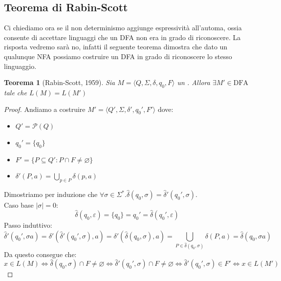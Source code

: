 \documentclass[a4paper,titlepage]{article}
\newtheorem{theorem}{Teorema}[section]
\theoremstyle{definition}
\newcommand{\DFA}{\langle Q,\Sigma,\delta,q_0,F\rangle}
\begin{document}
\subsection{Teorema di Rabin-Scott}
Ci chiediamo ora se il non determinismo aggiunge espressività all'automa, ossia consente di accettare linguaggi che un DFA non era in grado di riconoscere. La risposta vedremo sarà no, infatti il seguente teorema dimostra che dato un qualunque NFA possiamo costruire un DFA in grado di riconoscere lo stesso linguaggio. 
\begin{theorem}[Rabin-Scott, 1959]
	Sia $M = \DFA$ un . Allora $\exists M'\in\text{DFA}$ tale che $L(M) =  L(M')$
\end{theorem}
\begin{proof}
	Andiamo a costruire $M' = \langle Q', \Sigma, \delta', q_0', F' \rangle$ dove:
	\begin{itemize}
		\item $Q' = \mathcal P(Q)$
		\item $q_0' = \{q_0\}$
		\item $F'= \{P \subseteq Q': P\cap F \neq \varnothing\}$
		\item $\delta '(P, a) = \bigcup_{p \in P} \delta(p, a)$
	\end{itemize} 
	
	Dimostriamo per induzione che $\forall \sigma \in \Sigma^{*}.\hat{\delta}(q_0, \sigma) = \hat{\delta}'(q_0', \sigma)$. \\ Caso base $|\sigma| = 0$:
	\[
		\hat{\delta}(q_0, \varepsilon) = \{q_0\} = q_0' = \hat{\delta}(q_0', \varepsilon)
	\]
	Passo induttivo: 
	\[
		\hat\delta'(q_0', \sigma a) = 
		\delta'(\hat\delta'(q_0', \sigma), a) = 
		\delta'(\hat\delta(q_0, \sigma), a) = 
		\bigcup_{P \in \hat\delta(q_0, \sigma)} \delta(P, a) = \hat{\delta}(q_0, \sigma a)
	\]
	Da questo consegue che:
	\[
		x \in L(M) \iff \hat\delta(q_0, \sigma) \cap F \neq \varnothing \iff \hat\delta'(q_0', \sigma) \cap F \neq \varnothing 
				\iff \hat\delta'(q_0', \sigma) \in F' \iff x \in L(M') 
	\]
\end{proof}
\end{document}
